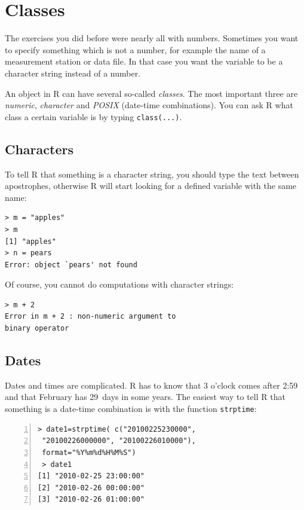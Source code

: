 \documentclass[a4paper,11pt,twocolumn,tablecaptionabove]{scrartcl} %
\begin{document}
\section{Classes}

The exercises you did before were nearly all with numbers. Sometimes you want to specify something which is not a number, for example the name of a measurement station or data file. In that case you want the variable to be a character string instead of a number. 

An object in R can have several so-called \emph{classes}. The most important three are
\emph{numeric}, \emph{character} and \emph{POSIX} (date-time combinations). You can ask R what class a certain variable is by typing \texttt{class(...)}. 

\subsection{Characters}
\label{sec:characters}

To tell R that something is a character string, you should type the text between apostrophes, otherwise R will start looking for a defined variable with the same name:

\begin{Verbatim}[frame=single,gobble=0]
> m = "apples"
> m
[1] "apples"
> n = pears
Error: object `pears' not found
\end{Verbatim}

Of course, you cannot do computations with character strings:

\begin{Verbatim}[frame=single,gobble=0]
> m + 2
Error in m + 2 : non-numeric argument to 
binary operator
\end{Verbatim}

\subsection{Dates}

Dates and times are complicated. R has to know that 3 o'clock comes after 2:59 and that February has 29~days in some years. The easiest way to tell R that something is a date-time combination is with the function \texttt{strptime}:

\begin{Verbatim}[frame=single,numbers=left,gobble=0, xleftmargin=0.35cm, numbersep=0.1cm]
> date1=strptime( c("20100225230000", 
 "20100226000000", "20100226010000"), 
 format="%Y%m%d%H%M%S")
 > date1
[1] "2010-02-25 23:00:00" 
[2] "2010-02-26 00:00:00" 
[3] "2010-02-26 01:00:00"
\end{Verbatim}
\end{document}

